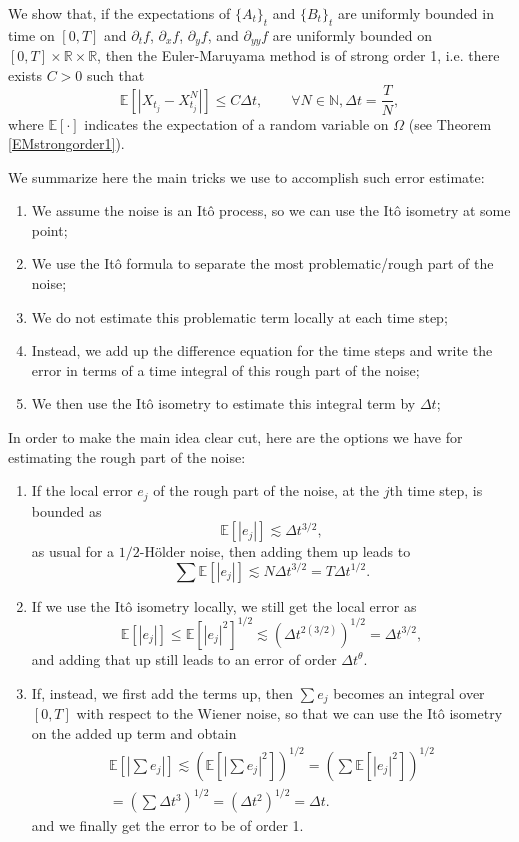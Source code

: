 \documentclass[reqno,12pt]{amsart}
\theoremstyle{plain}%
\theoremstyle{definition}
\begin{document}
We show that, if the expectations of $\{A_t\}_t$ and $\{B_t\}_t$ are uniformly bounded in time on $[0, T]$ and $\partial_t f$, $\partial_x f$, $\partial_y f$, and $\partial_{yy}f$ are uniformly bounded on $[0, T]\times \mathbb{R}\times \mathbb{R}$, then the Euler-Maruyama method is of strong order 1, i.e. there exists $C>0$ such that
\begin{equation}
  \mathbb{E}\left[ \left| X_{t_j} - X_{t_j}^N \right| \right] \leq C \Delta t, \qquad \forall N \in \mathbb{N},  \Delta t = \frac{T}{N},
\end{equation}
where $\mathbb{E}[\cdot]$ indicates the expectation of a random variable on $\Omega$ (see Theorem \ref{EMstrongorder1}).

We summarize here the main tricks we use to accomplish such error estimate:
\begin{enumerate}
  \item We assume the noise is an It\^o process, so we can use the It\^o isometry at some point;
  \item We use the It\^o formula to separate the most problematic/rough part of the noise;
  \item We do not estimate this problematic term locally at each time step;
  \item Instead, we add up the difference equation for the time steps and write the error in terms of a time integral of this rough part of the noise;
  \item We then use the It\^o isometry to estimate this integral term by $\Delta t$;
\end{enumerate}

In order to make the main idea clear cut, here are the options we have for estimating the rough part of the noise:
\begin{enumerate}
  \item If the local error $e_j$ of the rough part of the noise, at the $j$th time step, is bounded as
    $$
    \mathbb{E}[|e_j|] \lesssim \Delta t^{3/2},
    $$
    as usual for a $1/2$-H\"older noise, then adding them up leads to 
    $$
      \sum \mathbb{E}[|e_j|] \lesssim N\Delta t^{3/2} = T\Delta t^{1/2}.
    $$
    \item If we use the It\^o isometry locally, we still get the local error as
    $$
      \mathbb{E}[|e_j|] \leq \mathbb{E}[|e_j|^2]^{1/2} \lesssim \left(\Delta t^{2(3/2)} \right)^{1/2} = \Delta t^{3/2},
    $$
    and adding that up still leads to an error of order $\Delta t^{\theta}$.
    \item If, instead, we first add the terms up, then $\sum e_j$ becomes an integral over $[0, T]$ with respect to the Wiener noise, so that we can use the It\^o isometry on the added up term and obtain
    \begin{multline*}
      \mathbb{E}\left[ \left| \sum e_j \right| \right] \lesssim \left(\mathbb{E}\left[ \left| \sum e_j \right|^2 \right]\right)^{1/2} = \left( \sum \mathbb{E}[|e_j|^2] \right)^{1/2} \\
      = \left( \sum \Delta t^3 \right)^{1/2} = \left( \Delta t^2 \right)^{1/2} = \Delta t.
    \end{multline*}
    and we finally get the error to be of order 1.
\end{enumerate}
\end{document}
